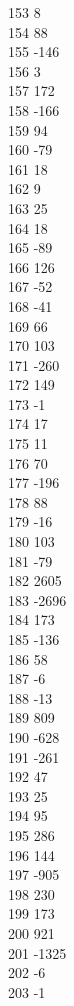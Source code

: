 { 153	8 \\
 154	88 \\
 155	-146 \\
 156	3 \\
 157	172 \\
 158	-166 \\
 159	94 \\
 160	-79 \\
 161	18 \\
 162	9 \\
 163	25 \\
 164	18 \\
 165	-89 \\
 166	126 \\
 167	-52 \\
 168	-41 \\
 169	66 \\
 170	103 \\
 171	-260 \\
 172	149 \\
 173	-1 \\
 174	17 \\
 175	11 \\
 176	70 \\
 177	-196 \\
 178	88 \\
 179	-16 \\
 180	103 \\
 181	-79 \\
 182	2605 \\
 183	-2696 \\
 184	173 \\
 185	-136 \\
 186	58 \\
 187	-6 \\
 188	-13 \\
 189	809 \\
 190	-628 \\
 191	-261 \\
 192	47 \\
 193	25 \\
 194	95 \\
 195	286 \\
 196	144 \\
 197	-905 \\
 198	230 \\
 199	173 \\
 200	921 \\
 201	-1325 \\
 202	-6 \\
 203	-1 \\
}
